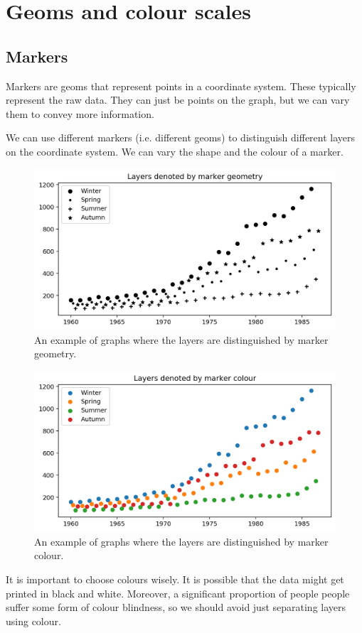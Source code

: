 \documentclass[a4paper, openany]{memoir}
\begin{document}
\section{Geoms and colour scales}
\subsection{Markers}
Markers are geoms that represent points in a coordinate system. These typically represent the raw data. They can just be points on the graph, but we can vary them to convey more information.

We can use different markers (i.e. different geoms) to distinguish different layers on the coordinate system. We can vary the shape and the colour of a marker.
\begin{figure}[H]
    \centering
    \includegraphics[scale=0.6]{src/2.38 Gas Example Plot 22.png}
    \caption{An example of graphs where the layers are distinguished by marker geometry.}
\end{figure}
\begin{figure}[H]
    \centering
    \includegraphics[scale=0.6]{src/2.39 Gas Example Plot 23.png}
    \caption{An example of graphs where the layers are distinguished by marker colour.}
\end{figure}
It is important to choose colours wisely. It is possible that the data might get printed in black and white. Moreover, a significant proportion of people people suffer some form of colour blindness, so we should avoid just separating layers using colour.
\end{document}
